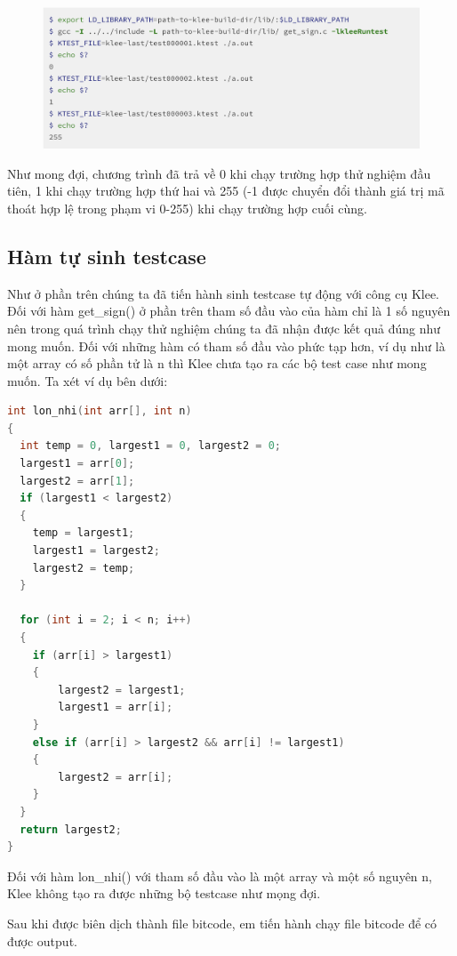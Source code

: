 \documentclass[12pt,a4paper]{report}
\begin{document}
\begin{figure}[ht]
\begin{center}
\includegraphics[scale=.3]{hinhanh/replayingtestcase.png}
\end{center}
\end{figure}

Như mong đợi, chương trình đã trả về 0 khi chạy trường hợp thử nghiệm đầu tiên, 1 khi chạy trường hợp thứ hai và 255 (-1 được chuyển đổi thành giá trị mã thoát hợp lệ trong phạm vi 0-255) khi chạy trường hợp cuối cùng.

\subsection{Hàm tự sinh testcase}
Như ở phần trên chúng ta đã tiến hành sinh testcase tự động với công cụ Klee. Đối với hàm get\_sign() ở phần trên tham số đầu vào của hàm chỉ là 1 số nguyên nên trong quá trình chạy thử nghiệm chúng ta đã nhận được kết quả đúng như mong muốn.  Đối với những hàm có tham số đầu vào phức tạp hơn, ví dụ như là một array có số phần tử là n thì Klee chưa tạo ra các bộ test case như  mong muốn. Ta xét ví dụ bên dưới:

\begin{lstlisting}[language=c]
int lon_nhi(int arr[], int n)
{
  int temp = 0, largest1 = 0, largest2 = 0;
  largest1 = arr[0];
  largest2 = arr[1];
  if (largest1 < largest2)
  { 
    temp = largest1;
    largest1 = largest2;
    largest2 = temp;
  }
  
  for (int i = 2; i < n; i++)
  { 
    if (arr[i] > largest1)
    {   
        largest2 = largest1;
        largest1 = arr[i];
    }
    else if (arr[i] > largest2 && arr[i] != largest1)
    {   
        largest2 = arr[i];
    }
  }
  return largest2;
}
\end{lstlisting}

Đối với hàm lon\_nhi() với tham số đầu vào là một array và một số nguyên n, Klee không tạo ra được những bộ testcase như mọng đợi.

Sau khi được biên dịch thành file bitcode, em tiến hành chạy file bitcode để có được output.
\end{document}
